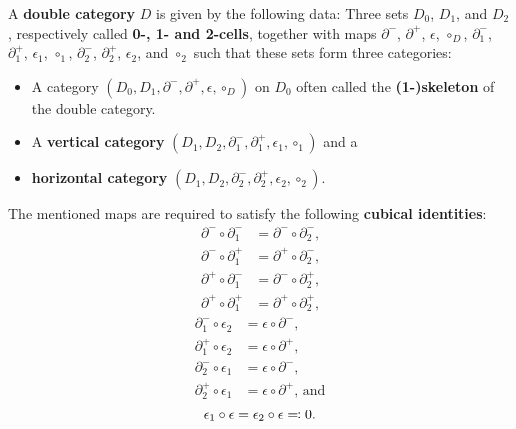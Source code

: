 \begin{defn}
A \textbf{double category} $D$ is given by the following data:
Three sets $D_0$, $D_1$, and $D_2$, respectively called \textbf{0-, 1- and
2-cells}, together with
maps $\partial^-$, $\partial^+$, $\epsilon$, $\circ_D$,
$\partial^-_1$, $\partial^+_1$, $\epsilon_1$, $\circ_1$,
$\partial^-_2$, $\partial^+_2$, $\epsilon_2$, and $\circ_2$
such that these sets form three categories:
\begin{itemize}
\item A category $(D_0, D_1, \partial^-, \partial^+, \epsilon, \circ_D)$ 
on $D_0$ often called the \textbf{(1-)skeleton} of the double category.
\item A \textbf{vertical category}
$(D_1, D_2, \partial^-_1, \partial^+_1, \epsilon_1, \circ_1)$ and a 
\item \textbf{horizontal category}
$(D_1, D_2, \partial^-_2, \partial^+_2, \epsilon_2, \circ_2)$.
\end{itemize}

The mentioned maps are required to satisfy the following \textbf{cubical
identities}:
\begin{equation} \label{eq:corner-ident}
\begin{aligned}
\partial^- \circ \partial^-_1 &= \partial^- \circ \partial^-_2\text{,} \\
\partial^- \circ \partial^+_1 &= \partial^+ \circ \partial^-_2\text{,} \\
\partial^+ \circ \partial^-_1 &= \partial^- \circ \partial^+_2\text{,} \\
\partial^+ \circ \partial^+_1 &= \partial^+ \circ \partial^+_2\text{,}
\end{aligned}
\end{equation}
\begin{equation} \label{eq:degen-ident}
\begin{aligned}
\partial^-_1 \circ \epsilon_2 &= \epsilon \circ \partial^-\text{,} \\
\partial^+_1 \circ \epsilon_2 &= \epsilon \circ \partial^+\text{,} \\
\partial^-_2 \circ \epsilon_1 &= \epsilon \circ \partial^-\text{,} \\
\partial^+_2 \circ \epsilon_1 &= \epsilon \circ \partial^+\text{, and}
\end{aligned}
\end{equation}
\begin{equation} \label{eq:zero-unique-ident}
\epsilon_1 \circ \epsilon = \epsilon_2 \circ \epsilon \eqqcolon 0\text{.}	 \\
\end{equation}


\end{defn}
